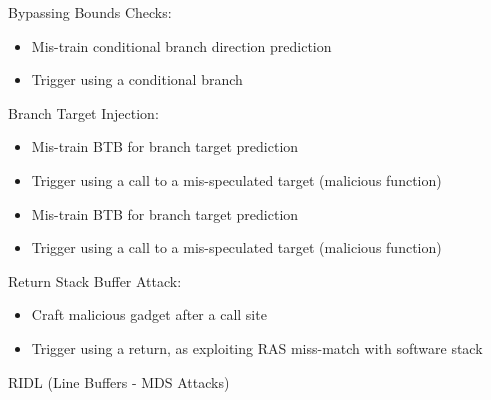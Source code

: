\documentclass[a4paper, 5pt, twocolumn]{article}
\begin{document}
Bypassing Bounds Checks:

\begin{itemize}[topsep=0pt,itemsep=-1ex,partopsep=1ex,parsep=1ex]
	\item Mis-train conditional branch direction prediction
	\item Trigger using a conditional branch \\
\end{itemize}

Branch Target Injection:

\begin{itemize}[topsep=0pt,itemsep=-1ex,partopsep=1ex,parsep=1ex]
	\item Mis-train BTB for branch target prediction
	\item Trigger using a call to a mis-speculated target (malicious function)\\
\end{itemize}

\begin{itemize}[topsep=0pt,itemsep=-1ex,partopsep=1ex,parsep=1ex]
	\item Mis-train BTB for branch target prediction
	\item Trigger using a call to a mis-speculated target (malicious function)\\
\end{itemize}

Return Stack Buffer Attack:

\begin{itemize}[topsep=0pt,itemsep=-1ex,partopsep=1ex,parsep=1ex]
	\item Craft malicious gadget after a call site
	\item Trigger using a return, as exploiting RAS miss-match with software stack\\
\end{itemize}

RIDL (Line Buffers - MDS Attacks)\\
\end{document}
